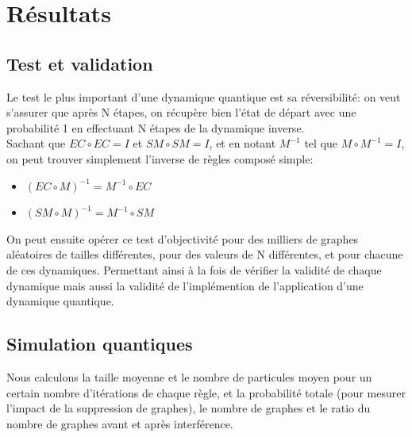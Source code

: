 \documentclass[11pts,french]{article}
\begin{document}
\section{ Résultats }

\subsection{ Test et validation }

Le test le plus important d'une dynamique quantique est sa réversibilité: on veut s'assurer que après N étapes, on récupère bien l'état de départ avec une probabilité 1 en effectuant N étapes de la dynamique inverse. \\

Sachant que $EC \circ EC = I$ et $SM \circ SM = I$, et en notant $M^{-1}$ tel que $M \circ M^{-1} = I$, on peut trouver simplement l'inverse de règles composé simple:

\begin{itemize}
\itemsep0em
  \item $\left(EC \circ M\right)^{-1} = M^{-1} \circ EC$
  \item $\left(SM \circ M\right)^{-1} = M^{-1} \circ SM$
\end{itemize}

On peut ensuite opérer ce test d'objectivité pour des milliers de graphes aléatoires de tailles différentes, pour des valeurs de N différentes, et pour chacune de ces dynamiques. Permettant ainsi à la fois de vérifier la validité de chaque dynamique mais aussi la validité de l'implémention de l'application d'une dynamique quantique.

\subsection{ Simulation quantiques }

Nous calculons la taille moyenne et le nombre de particules moyen pour un certain nombre d'itérations de chaque règle, et la probabilité totale (pour mesurer l'impact de la suppression de graphes), le nombre de graphes et le ratio du nombre de graphes avant et après interférence. \\
\end{document}
